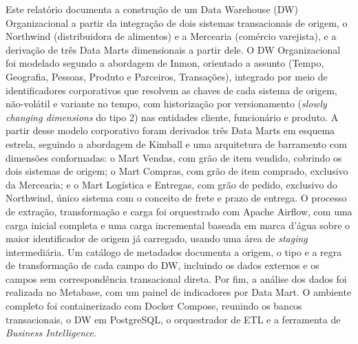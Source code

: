 
\begin{resumo}
Este relatório documenta a construção de um Data Warehouse (DW) Organizacional a partir da integração de dois sistemas transacionais de origem, o Northwind (distribuidora de alimentos) e a Mercearia (comércio varejista), e a derivação de três Data Marts dimensionais a partir dele. O DW Organizacional foi modelado segundo a abordagem de Inmon, orientado a assunto (Tempo, Geografia, Pessoas, Produto e Parceiros, Transações), integrado por meio de identificadores corporativos que resolvem as chaves de cada sistema de origem, não-volátil e variante no tempo, com historização por versionamento (\textit{slowly changing dimensions} do tipo 2) nas entidades cliente, funcionário e produto. A partir desse modelo corporativo foram derivados três Data Marts em esquema estrela, seguindo a abordagem de Kimball e uma arquitetura de barramento com dimensões conformadas: o Mart Vendas, com grão de item vendido, cobrindo os dois sistemas de origem; o Mart Compras, com grão de item comprado, exclusivo da Mercearia; e o Mart Logística e Entregas, com grão de pedido, exclusivo do Northwind, único sistema com o conceito de frete e prazo de entrega. O processo de extração, transformação e carga foi orquestrado com Apache Airflow, com uma carga inicial completa e uma carga incremental baseada em marca d'água sobre o maior identificador de origem já carregado, usando uma área de \textit{staging} intermediária. Um catálogo de metadados documenta a origem, o tipo e a regra de transformação de cada campo do DW, incluindo os dados externos e os campos sem correspondência transacional direta. Por fim, a análise dos dados foi realizada no Metabase, com um painel de indicadores por Data Mart. O ambiente completo foi containerizado com Docker Compose, reunindo os bancos transacionais, o DW em PostgreSQL, o orquestrador de ETL e a ferramenta de \textit{Business Intelligence}.
\end{resumo}
